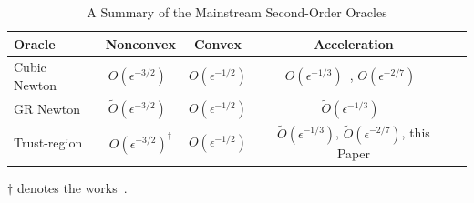 \documentclass{mcom-l}
\numberwithin{equation}{section}
\begin{document}
\begin{table}[t]
    \caption{A Summary of the Mainstream Second-Order Oracles}
    \label{table.summary}
    \vskip 0.15in
    \begin{center}
        \begin{small}
            \begin{sc}
                \begin{tabular}{lcccr}
                    \toprule
                    Oracle       & Nonconvex                                           & Convex                                                                     & Acceleration                                                                                        \\
                    \midrule
                    Cubic Newton & $O(\epsilon^{-3/2})$~\cite{nesterov2006cubic}       & $O(\epsilon^{-1/2})$\cite{nesterov2006cubic}                               & $O(\epsilon^{-1/3})$~\cite{nesterov2008accelerating}, $O(\epsilon^{-2/7})$~\cite{carmon2022optimal} \\
                    GR Newton    & $\tilde{O} (\epsilon^{-3/2})$~\cite{gratton2023yet} & $O(\epsilon^{-1/2})$\cite{mishchenko_regularized_2023}                     & $\tilde O(\epsilon^{-1/3})$~\cite{doikov2020contracting}                                            \\
                    Trust-region & $O(\epsilon^{-3/2})^\dagger$                        & $O(\epsilon^{-1/2})$\cite{jiang2024nonconvexityuniversaltrustregionmethod} & $\tilde O(\epsilon^{-1/3})$, $\tilde O(\epsilon^{-2/7})$, this Paper                                \\
                    \bottomrule
                \end{tabular}
            \end{sc}
        \end{small}
    \end{center}
    \vskip -0.1in
    \begin{tablenotes}
        \small
        \item $\dagger$ denotes the works~\cite{curtis2017trust,curtis2021trust,luenberger_linear_2021,hamad2022consistently,hamad2024simplepracticaladaptivetrustregion,jiang2024nonconvexityuniversaltrustregionmethod}.
    \end{tablenotes}
\end{table}
\end{document}
